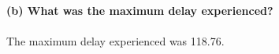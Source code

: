 \noindent\textbf{(b) What was the maximum delay experienced?\\\\}
The maximum delay experienced was 118.76.\\\\